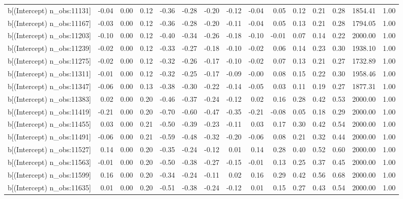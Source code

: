 \begin{table}[ht]
\begin{tabular}{rrrrrrrrrrrrrrr}
  b[(Intercept) n\_obs:11131] & -0.04 & 0.00 & 0.12 & -0.36 & -0.28 & -0.20 & -0.12 & -0.04 & 0.05 & 0.12 & 0.21 & 0.28 & 1854.41 & 1.00 \\ 
  b[(Intercept) n\_obs:11167] & -0.03 & 0.00 & 0.12 & -0.36 & -0.28 & -0.20 & -0.11 & -0.04 & 0.05 & 0.13 & 0.21 & 0.28 & 1794.05 & 1.00 \\ 
  b[(Intercept) n\_obs:11203] & -0.10 & 0.00 & 0.12 & -0.40 & -0.34 & -0.26 & -0.18 & -0.10 & -0.01 & 0.07 & 0.14 & 0.22 & 2000.00 & 1.00 \\ 
  b[(Intercept) n\_obs:11239] & -0.02 & 0.00 & 0.12 & -0.33 & -0.27 & -0.18 & -0.10 & -0.02 & 0.06 & 0.14 & 0.23 & 0.30 & 1938.10 & 1.00 \\ 
  b[(Intercept) n\_obs:11275] & -0.02 & 0.00 & 0.12 & -0.32 & -0.26 & -0.17 & -0.10 & -0.02 & 0.07 & 0.13 & 0.21 & 0.27 & 1732.89 & 1.00 \\ 
  b[(Intercept) n\_obs:11311] & -0.01 & 0.00 & 0.12 & -0.32 & -0.25 & -0.17 & -0.09 & -0.00 & 0.08 & 0.15 & 0.22 & 0.30 & 1958.46 & 1.00 \\ 
  b[(Intercept) n\_obs:11347] & -0.06 & 0.00 & 0.13 & -0.38 & -0.30 & -0.22 & -0.14 & -0.05 & 0.03 & 0.11 & 0.19 & 0.27 & 1877.31 & 1.00 \\ 
  b[(Intercept) n\_obs:11383] & 0.02 & 0.00 & 0.20 & -0.46 & -0.37 & -0.24 & -0.12 & 0.02 & 0.16 & 0.28 & 0.42 & 0.53 & 2000.00 & 1.00 \\ 
  b[(Intercept) n\_obs:11419] & -0.21 & 0.00 & 0.20 & -0.70 & -0.60 & -0.47 & -0.35 & -0.21 & -0.08 & 0.05 & 0.18 & 0.29 & 2000.00 & 1.00 \\ 
  b[(Intercept) n\_obs:11455] & 0.03 & 0.00 & 0.21 & -0.50 & -0.39 & -0.23 & -0.11 & 0.03 & 0.17 & 0.30 & 0.42 & 0.54 & 2000.00 & 1.00 \\ 
  b[(Intercept) n\_obs:11491] & -0.06 & 0.00 & 0.21 & -0.59 & -0.48 & -0.32 & -0.20 & -0.06 & 0.08 & 0.21 & 0.32 & 0.44 & 2000.00 & 1.00 \\ 
  b[(Intercept) n\_obs:11527] & 0.14 & 0.00 & 0.20 & -0.35 & -0.24 & -0.12 & 0.01 & 0.14 & 0.28 & 0.40 & 0.52 & 0.60 & 2000.00 & 1.00 \\ 
  b[(Intercept) n\_obs:11563] & -0.01 & 0.00 & 0.20 & -0.50 & -0.38 & -0.27 & -0.15 & -0.01 & 0.13 & 0.25 & 0.37 & 0.45 & 2000.00 & 1.00 \\ 
  b[(Intercept) n\_obs:11599] & 0.16 & 0.00 & 0.20 & -0.34 & -0.24 & -0.11 & 0.02 & 0.16 & 0.29 & 0.42 & 0.56 & 0.68 & 2000.00 & 1.00 \\ 
  b[(Intercept) n\_obs:11635] & 0.01 & 0.00 & 0.20 & -0.51 & -0.38 & -0.24 & -0.12 & 0.01 & 0.15 & 0.27 & 0.43 & 0.54 & 2000.00 & 1.00 \\ 

\end{tabular}
\end{table}
